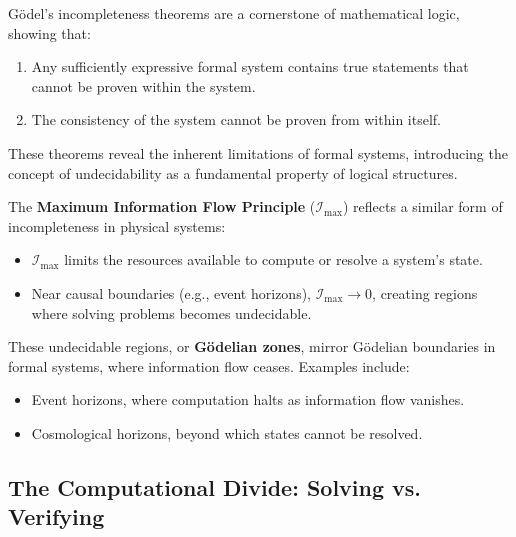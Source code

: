 \documentclass[12pt]{article}
\begin{document}
Gödel’s incompleteness theorems are a cornerstone of mathematical logic, showing that:
\begin{enumerate}
    \item Any sufficiently expressive formal system contains true statements that cannot be proven within the system.
    \item The consistency of the system cannot be proven from within itself.
\end{enumerate}

These theorems reveal the inherent limitations of formal systems, introducing the concept of undecidability as a fundamental property of logical structures.

The \textbf{Maximum Information Flow Principle} ($\mathcal{I}_{\text{max}}$) reflects a similar form of incompleteness in physical systems:
\begin{itemize}
    \item $\mathcal{I}_{\text{max}}$ limits the resources available to compute or resolve a system’s state.
    \item Near causal boundaries (e.g., event horizons), $\mathcal{I}_{\text{max}} \to 0$, creating regions where solving problems becomes undecidable.
\end{itemize}

These undecidable regions, or \textbf{Gödelian zones}, mirror Gödelian boundaries in formal systems, where information flow ceases. Examples include:
\begin{itemize}
    \item Event horizons, where computation halts as information flow vanishes.
    \item Cosmological horizons, beyond which states cannot be resolved.
\end{itemize}

\subsection{The Computational Divide: Solving vs. Verifying}
\end{document}
